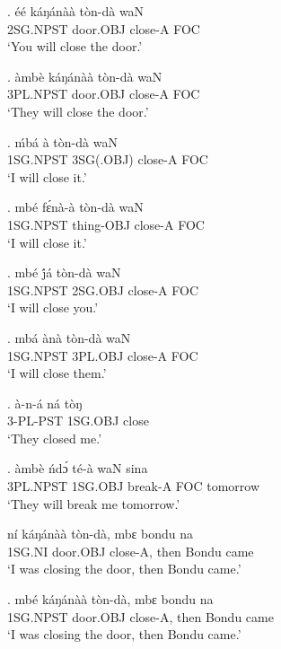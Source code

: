 \documentclass{assets/fieldnotes}
\begin{document}

\exg.
éé         káŋánàà    tòn-dà    waN \\
2SG.NPST   door.OBJ   close-A   FOC \\%
`You will close the door.'

\exg.
àmbè       káŋánàà    tòn-dà    waN \\
3PL.NPST   door.OBJ   close-A   FOC \\%
`They will close the door.'

\exg.
ḿbá        à           tòn-dà    waN \\
1SG.NPST   3SG(.OBJ)   close-A   FOC \\%
`I will close it.'

\exg.
mbé        fɛ́nà-à      tòn-dà    waN \\
1SG.NPST   thing-OBJ   close-A   FOC \\%
`I will close it.'

\exg.
mbé        j́á        tòn-dà    waN \\
1SG.NPST   2SG.OBJ   close-A   FOC \\%
`I will close you.'

\exg.
mbá        ànà       tòn-dà    waN \\
1SG.NPST   3PL.OBJ   close-A   FOC \\%
`I will close them.'

\exg.
à-n-á       ná        tòŋ   \\
3-PL-PST   1SG.OBJ   close \\%
`They closed me.'

\exg.
àmbè       ńdɔ́       té-à      waN   sina     \\
3PL.NPST   1SG.OBJ   break-A   FOC   tomorrow \\%
`They will break me tomorrow.'


ní       káŋánàà    tòn-dà,    mbɛ    bondu   na   \\
1SG.NI   door.OBJ   close-A,   then   Bondu   came \\%
`I was closing the door, then Bondu came.'

\exg.
mbé        káŋánàà    tòn-dà,    mbɛ    bondu   na   \\
1SG.NPST   door.OBJ   close-A,   then   Bondu   came \\%
`I was closing the door, then Bondu came.'
\end{document}
